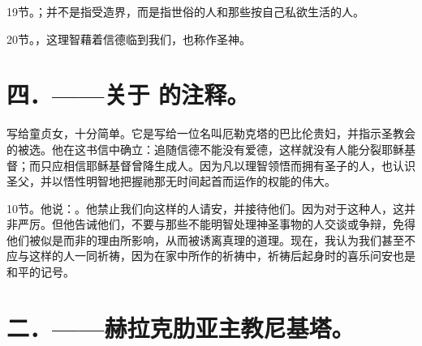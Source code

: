  19节。；并不是指受造界，而是指世俗的人和那些按自己私欲生活的人。\par

 20节。，这理智藉着信德临到我们，也称作圣神。\par


\section{四．——关于  的注释。}

 写给童贞女，十分简单。它是写给一位名叫厄勒克塔的巴比伦贵妇，并指示圣教会的被选。他在这书信中确立：追随信德不能没有爱德，这样就没有人能分裂耶稣基督；而只应相信耶稣基督曾降生成人。因为凡以理智领悟而拥有圣子的人，也认识圣父，并以悟性明智地把握祂那无时间起首而运作的权能的伟大。\par

 10节。他说：。他禁止我们向这样的人请安，并接待他们。因为对于这种人，这并非严厉。但他告诫他们，不要与那些不能明智处理神圣事物的人交谈或争辩，免得他们被似是而非的理由所影响，从而被诱离真理的道理。现在，我认为我们甚至不应与这样的人一同祈祷，因为在家中所作的祈祷中，祈祷后起身时的喜乐问安也是和平的记号。\par


\section{二．——赫拉克肋亚主教尼基塔。}

\par

\par

